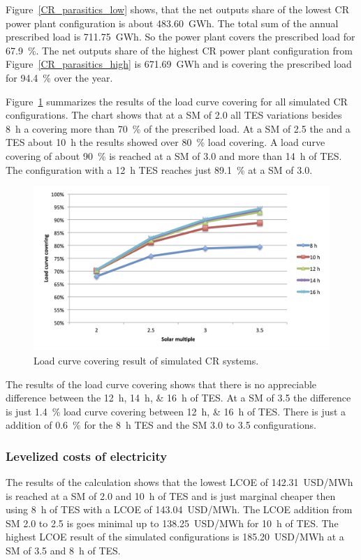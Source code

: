 Figure~\ref{CR_parasitics_low} shows, that the net outputs share of the lowest CR power plant configuration is about \SI{483.60}{GWh}.  The total sum of the annual prescribed load is \SI{711.75}{GWh}. So the power plant covers the prescribed load for 67.9~\%. The net outputs share of the highest CR power plant configuration from Figure~\ref{CR_parasitics_high} is \SI{671.69}{GWh} and is covering the prescribed load for 94.4~\% over the year.

Figure~\ref{CR_LCCF} summarizes the results of the load curve covering for all simulated CR configurations. The chart shows that at a SM of 2.0 all TES variations besides \SI{8}{h} a covering more than 70~\% of the prescribed load. At a SM of 2.5 the and a TES about \SI{10}{h} the results showed over 80~\% load covering. A load curve covering of about 90~\% is reached at a SM of 3.0 and more than \SI{14}{h} of TES. The configuration with a \SI{12}{h} TES reaches just 89.1~\% at a SM of 3.0. 

\begin{figure}[htbp]  
\centering
\includegraphics[width=1\linewidth]{FIG/CR_LCCF}
\caption[Load curve covering result of simulated CR systems.]{Load curve covering result of simulated CR systems.}\label{CR_LCCF}
\end{figure}
The results of the load curve covering shows that there is no appreciable difference between the \SIlist{12;14;16}{h} of TES. At a SM of 3.5 the difference is just \SI{1.4}{\percent} load curve covering between \SIlist{12;16}{h} of TES. There is just a addition of \SI{0.6}{\percent} for the \SI{8}{h} TES and the SM 3.0 to 3.5 configurations.
 
\subsubsection{Levelized costs of electricity}
The results of the calculation shows that the lowest LCOE of \SI{142.31}{USD/MWh} is reached at a SM of 2.0 and \SI{10}{h} of TES and is just  marginal cheaper then using \SI{8}{h} of TES with a LCOE of \SI{143.04}{USD/MWh}. The LCOE addition from SM 2.0 to 2.5 is goes minimal up to \SI{138.25}{USD/MWh} for \SI{10}{h} of TES. The highest LCOE result of the simulated configurations is \SI{185.20}{USD/MWh} at a SM of 3.5 and \SI{8}{h} of TES. 

